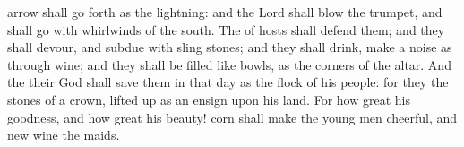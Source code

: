 {arrow shall go
forth as the
lightning: and the
Lord
{} shall
blow the
trumpet, and shall
go with
whirlwinds of the
south.
The
{} of
hosts shall
defend them; and they shall
devour, and
subdue with
sling
stones; and they shall
drink,
{} make a
noise as through
wine; and they shall be
filled like
bowls,
{} as the
corners of the
altar.
And the
{} their
God shall
save them in that
day as the
flock of his
people: for they
{} the
stones of a
crown, lifted up as an
ensign upon his
land.
For how great
{} his
goodness, and how great
{} his
beauty!
corn shall make the young
men
cheerful, and new
wine the
maids.

}
